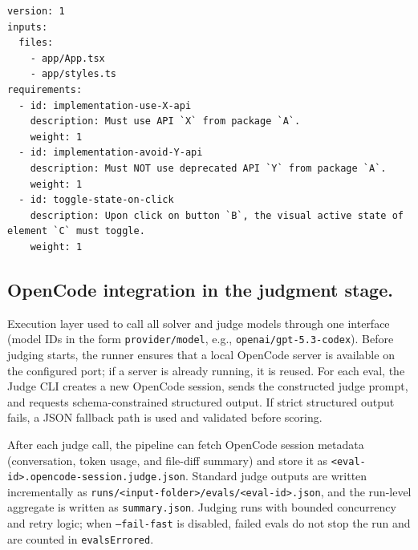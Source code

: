 \documentclass[11pt]{article}
\begin{document}
\begin{listing}[h]
\begin{tcolorbox}[colback=gray!20,  %
                  colframe=gray!60, %
                  rounded corners,   %
                  boxrule=0.5mm,    %
                  left=4mm, right=4mm, top=2mm, bottom=2mm, %
                  title=\texttt{requirements.yaml} contract]    %
\begin{verbatim}
version: 1
inputs:
  files:
    - app/App.tsx
    - app/styles.ts
requirements:
  - id: implementation-use-X-api
    description: Must use API `X` from package `A`.
    weight: 1
  - id: implementation-avoid-Y-api
    description: Must NOT use deprecated API `Y` from package `A`.
    weight: 1
  - id: toggle-state-on-click
    description: Upon click on button `B`, the visual active state of element `C` must toggle.
    weight: 1
\end{verbatim}
\end{tcolorbox}
\caption{The contract of \texttt{requirements.yaml} file.}
\label{lst:requirements-yaml-template}
\end{listing}

\subsection{OpenCode integration in the judgment stage.}
Execution layer used to call all solver and judge models through one interface (model IDs in the form \texttt{provider/model}, e.g., \texttt{openai/gpt-5.3-codex}). Before judging starts, the runner ensures that a local OpenCode server is available on the configured port; if a server is already running, it is reused. For each eval, the Judge CLI creates a new OpenCode session, sends the constructed judge prompt, and requests schema-constrained structured output. If strict structured output fails, a JSON fallback path is used and validated before scoring.

After each judge call, the pipeline can fetch OpenCode session metadata (conversation, token usage, and file-diff summary) and store it as \texttt{<eval-id>.opencode-session.judge.json}. Standard judge outputs are written incrementally as \texttt{runs/<input-folder>/evals/<eval-id>.json}, and the run-level aggregate is written as \texttt{summary.json}. Judging runs with bounded concurrency and retry logic; when \texttt{--fail-fast} is disabled, failed evals do not stop the run and are counted in \texttt{evalsErrored}.
\end{document}

